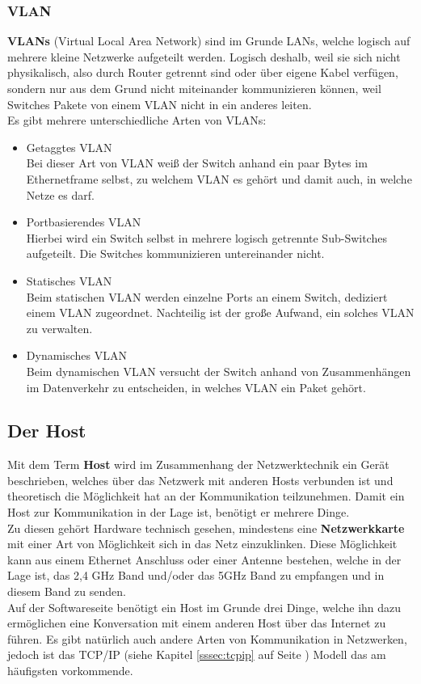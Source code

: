 \documentclass[12pt,a4paper]{report}
\begin{document}
\begin{onehalfspace}
\subsubsection{VLAN}\label{sssec:vlan}
\textbf{VLANs} (Virtual Local Area Network) sind im Grunde LANs, welche logisch auf mehrere kleine Netzwerke aufgeteilt werden. Logisch deshalb, weil sie sich nicht physikalisch, also durch Router getrennt sind oder über eigene Kabel verfügen, sondern nur aus dem Grund nicht miteinander kommunizieren können, weil Switches Pakete von einem VLAN nicht in ein anderes leiten.\\
Es gibt mehrere unterschiedliche Arten von VLANs:\\
\begin{itemize}
\item Getaggtes VLAN\\
Bei dieser Art von VLAN weiß der Switch anhand ein paar Bytes im Ethernetframe selbst, zu welchem VLAN es gehört und damit auch, in welche Netze es darf.
\item Portbasierendes VLAN\\
Hierbei wird ein Switch selbst in mehrere logisch getrennte Sub-Switches aufgeteilt. Die Switches kommunizieren untereinander nicht.
\item Statisches VLAN\\
Beim statischen VLAN werden einzelne Ports an einem Switch, dediziert einem VLAN zugeordnet. Nachteilig ist der große Aufwand, ein solches VLAN zu verwalten.
\item Dynamisches VLAN\\
Beim dynamischen VLAN versucht der Switch anhand von Zusammenhängen im Datenverkehr zu entscheiden, in welches VLAN ein Paket gehört. 
\end{itemize}

\subsection{Der Host}
Mit dem Term \textbf{Host} wird im Zusammenhang der Netzwerktechnik ein Gerät beschrieben, welches über das Netzwerk mit anderen Hosts verbunden ist und theoretisch die Möglichkeit hat an der Kommunikation teilzunehmen. Damit ein Host zur Kommunikation in der Lage ist, benötigt er mehrere Dinge.\\
Zu diesen gehört Hardware technisch gesehen, mindestens eine \textbf{Netzwerkkarte} mit einer Art von Möglichkeit sich in das Netz einzuklinken. Diese Möglichkeit kann aus einem Ethernet Anschluss oder einer Antenne bestehen, welche in der Lage ist, das 2,4 GHz Band und/oder das 5GHz Band zu empfangen und in diesem Band zu senden.\\
Auf der Softwareseite benötigt ein Host im Grunde drei Dinge, welche ihn dazu ermöglichen eine Konversation mit einem anderen Host über das Internet zu führen. Es gibt natürlich auch andere Arten von Kommunikation in Netzwerken, jedoch ist das TCP/IP (siehe Kapitel \ref{sssec:tcpip} auf Seite \pageref{sssec:tcpip}) Modell das am häufigsten vorkommende. 


\end{onehalfspace}
\end{document}
